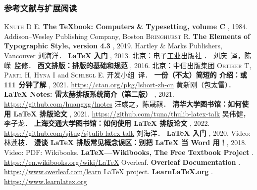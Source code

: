 \begin{frame}[fragile]
\frametitle{参考文献与扩展阅读}
\begin{multicols}{2}
\tiny
\newcommand\BOOK[1]{\textbf{#1}}
\newcommand\TAG[1]{\CASE{[#1]}}
\begin{thebibliography}{99}
  \bibitem{}
    \textsc{Knuth D E}.
    \BOOK{The \TeX book: Computers \& Typesetting, volume C} \TAG{M}, 1984.
    \newblock Addison--Wesley Publishing Company, Boston
  \bibitem{}
    \textsc{Bringhurst R}.
    \BOOK{The Elements of Typographic Style, version 4.3} \TAG{M}, 2019.
    \newblock Hartley \& Marks Publishers, Vancouver
  \bibitem{}
    刘海洋．
    \BOOK{\LaTeX{} 入门} \TAG{M}, 2013.
    \newblock 北京：电子工业出版社
  \bibitem{}
    ．
    刘庆~译，陈嵘~监修．
    \BOOK{西文排版：排版的基础和规范} \TAG{M}, 2016.
    \newblock 北京：中信出版集团
  \bibitem{}
    \textsc{Oetiker T}, \textsc{Partl H}, \textsc{Hyna I} and \textsc{Schlegl E}.
    \CTeX{} 开发小组~译．
    \BOOK{一份（不太）简短的 \LaTeXe{} 介绍：或 111 分钟了解 \LaTeXe{}} \TAG{EB/OL}, 2021.
    \newblock \url{https://ctan.org/pkg/lshort-zh-cn}
  \bibitem{}
    黄新刚（包太雷）．
    \BOOK{\LaTeX{} Notes: 雷太赫排版系统简介（第二版）} \TAG{EB/OL}, 2021.
    \newblock \url{https://github.com/huangxg/lnotes}
  \bibitem{}
    汪彧之，陈晟祺．
    \BOOK{清华大学图书馆：如何使用 \LaTeX{} 排版论文} \TAG{EB/OL}, 2021.
    \newblock \url{https://github.com/tuna/thulib-latex-talk}
  \bibitem{}
    吴伟健，李子龙．
    \BOOK{上海交通大学图书馆：如何使用 \LaTeX{} 排版论文} \TAG{EB/OL}, 2022.
    \newblock \url{https://github.com/sjtug/sjtulib-latex-talk}
  \bibitem{}
    刘海洋．
    \BOOK{\LaTeX{} 入门} \TAG{EB/OL}, 2020.
    \newblock Video: \href{https://www.bilibili.com/video/BV1s7411U7Pr}{\faVideo}
  \bibitem{}
    林莲枝．
    \BOOK{漫谈 \LaTeX{} 排版常见概念误区：别把 \LaTeX{} 当 Word 用！}\TAG{EB/OL}, 2018.
    \newblock Video: \href{https://www.bilibili.com/video/BV1r4411o7KJ}{\faVideo}\quad
      PDF: \href{http://static.latexstudio.net/wp-content/uploads/2018/03/LianTze-presentation-0320-forReading.pdf}{\faDownload}
  \bibitem{}
    Wikibooks.
    \BOOK{\LaTeX{}---Wikibooks, The Free Textbook Project} \TAG{EB/OL}.
    \newblock \url{https://en.wikibooks.org/wiki/LaTeX}
  \bibitem{}
    Overleaf.
    \BOOK{Overleaf Documentation} \TAG{EB/OL}.
    \newblock \url{https://www.overleaf.com/learn}
  \bibitem{}
    \LaTeX{} project.
    \BOOK{Learn\LaTeX.org} \TAG{EB/OL}.
    \newblock \url{https://www.learnlatex.org}
\end{thebibliography}
\end{multicols}
\end{frame}

